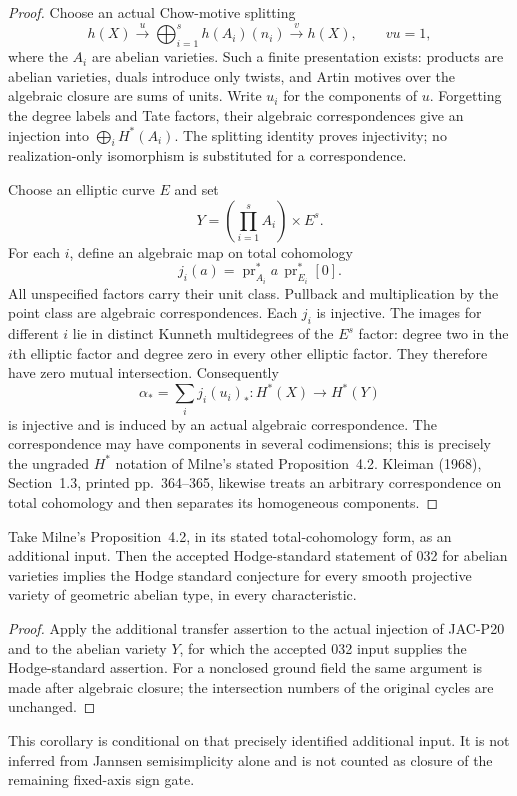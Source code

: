 \begin{proof}
Choose an actual Chow-motive splitting
\[
 h(X)\xrightarrow{u}\bigoplus_{i=1}^{s}h(A_i)(n_i)
       \xrightarrow{v}h(X),\qquad vu=1,
\]
where the $A_i$ are abelian varieties. Such a finite presentation
exists:
products are abelian varieties, duals introduce only twists,
and Artin motives over the algebraic closure are sums of units.
Write $u_i$ for the components of $u$. Forgetting the degree
labels and Tate factors, their algebraic correspondences give
an injection into $\bigoplus_iH^*(A_i)$. The splitting identity
proves injectivity; no realization-only isomorphism is substituted
for a correspondence.

Choose an elliptic curve $E$ and set
\[
                 Y=\left(\prod_{i=1}^{s}A_i\right)\times E^s.
\]
For each $i$, define an algebraic map on total cohomology
\[
 j_i(a)=\operatorname{pr}_{A_i}^{*}a\,
                   \operatorname{pr}_{E_i}^{*}[0].
\]
All unspecified factors carry their unit class. Pullback and
multiplication by the point class are algebraic correspondences.
Each $j_i$ is injective. The images for different $i$ lie in
distinct Kunneth multidegrees of the $E^s$ factor: degree two in
the $i$th elliptic factor and degree zero in every other elliptic
factor. They therefore have zero mutual intersection. Consequently
\[
                    \alpha_* =\sum_i j_i(u_i)_*
                    :H^*(X)\longrightarrow H^*(Y)
\]
is injective and is induced by an actual algebraic correspondence.
The correspondence may have components in several codimensions;
this is precisely the ungraded $H^*$ notation of Milne's stated
Proposition~4.2. Kleiman (1968), Section~1.3, printed pp.~364--365,
likewise treats an arbitrary correspondence on total cohomology
and then separates its homogeneous components.
\end{proof}

\begin{corollary}
Take Milne's Proposition~4.2, in its stated total-cohomology
form, as an additional input. Then the accepted Hodge-standard
statement of 032 for abelian varieties implies the Hodge standard
conjecture for every smooth projective variety of geometric
abelian type, in every characteristic.
\end{corollary}
\begin{proof}
Apply the additional transfer assertion to the actual injection
of JAC-P20 and to the abelian variety $Y$, for which the accepted
032 input supplies the Hodge-standard assertion.
For a nonclosed ground field the same argument is made after
algebraic closure; the intersection numbers of the original
cycles are unchanged.
\end{proof}
This corollary is conditional on that precisely identified
additional input. It is not inferred from Jannsen semisimplicity
alone and is not counted as closure of the remaining fixed-axis
sign gate.

